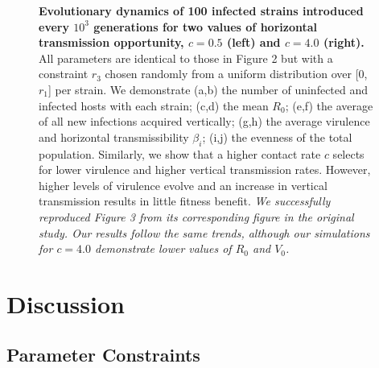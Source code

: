\begin{figure}[tbp]
    \medskip
    \hfil
\caption{\textbf{Evolutionary dynamics of 100 infected strains introduced every
$10^3$ generations for two values of horizontal transmission opportunity,
$c = 0.5$ (left) and $c = 4.0$ (right).} All parameters are identical to those
in Figure 2 but with a constraint $r_3$ chosen randomly from a uniform
distribution over [0, $r_1$] per strain. We demonstrate (a,b) the number of
uninfected and infected hosts with each strain; (c,d) the mean $R_0$; (e,f) the
average of all new infections acquired vertically; (g,h) the average virulence
and horizontal transmissibility $\beta_i$; (i,j) the evenness of the total
population. Similarly, we show that a higher contact rate $c$ selects for lower
virulence and higher vertical transmission rates. However, higher levels of
virulence evolve and an increase in vertical transmission results in little
fitness benefit. \textit{We successfully reproduced Figure 3 from its
corresponding figure in the original study. Our results follow the same trends,
although our simulations for $c = 4.0$ demonstrate lower values of $R_0$ and
$V_0$.}
}
\label{fig:figure3}
\end{figure}

\section{Discussion}
\subsection{Parameter Constraints}

